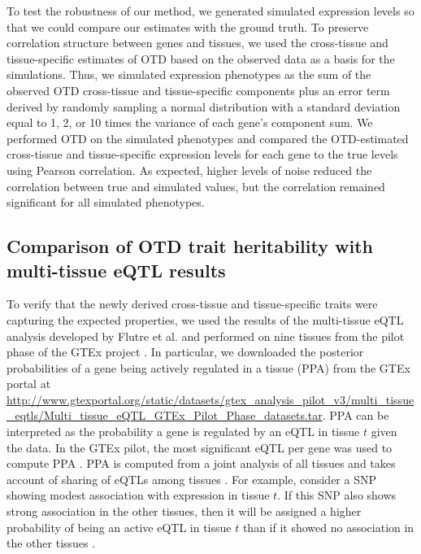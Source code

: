 \documentclass[10pt,letterpaper]{article}
\begin{document}
To test the robustness of our method, we generated simulated expression levels so that we could compare our estimates with the ground truth. To preserve correlation structure between genes and tissues, we used the cross-tissue and tissue-specific estimates of OTD based on the observed data as a basis for the simulations. Thus, we simulated expression phenotypes as the sum of the observed OTD cross-tissue and tissue-specific components plus an error term derived by randomly sampling a normal distribution with a standard deviation equal to 1, 2, or 10 times the variance of each gene's component sum. We performed OTD on the simulated phenotypes and compared the OTD-estimated cross-tissue and tissue-specific expression levels for each gene to the true levels using Pearson correlation. As expected, higher levels of noise reduced the correlation between true and simulated values, but the correlation remained significant for all simulated phenotypes.

\subsection*{Comparison of OTD trait heritability with multi-tissue eQTL
results}\label{comparison-of-otd-pve-to-multi-tissue-eqtl-results}

To verify that the newly derived cross-tissue and tissue-specific traits were capturing the expected properties, we used the results of the multi-tissue eQTL analysis developed by Flutre et al. \cite{Flutre_2013} and performed on nine tissues from the pilot phase of the GTEx project \cite{Ardlie_2015}.  
In particular, we downloaded the posterior probabilities of a gene being actively regulated in a tissue (PPA) from the GTEx portal at \url{http://www.gtexportal.org/static/datasets/gtex_analysis_pilot_v3/multi_tissue_eqtls/Multi_tissue_eQTL_GTEx_Pilot_Phase_datasets.tar}. PPA can be interpreted as
the probability a gene is regulated by an eQTL in tissue \(t\) given the data. In the GTEx pilot, the most significant eQTL per gene was used to compute PPA \cite{Ardlie_2015}. PPA is computed from a joint analysis of all tissues and takes account of sharing of eQTLs among tissues \cite{Flutre_2013}. For example, consider a SNP showing modest association with expression in tissue \(t\). If this SNP also shows strong association in the other tissues, then it will be assigned a higher probability of being an active eQTL in tissue \(t\) than if it showed no association in the other tissues \cite{Flutre_2013}.
\end{document}

